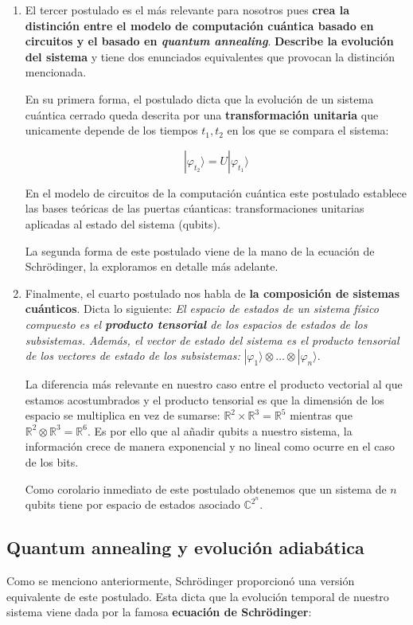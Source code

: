 \documentclass[11pt]{article}
\newcommand*{\C}{\mathds{C}}
\newcommand*{\R}{\mathbb{R}}
\newcommand*{\ra}{\rangle}
\begin{document}
\begin{enumerate}
	\item El tercer postulado es el más relevante para nosotros pues \textbf{crea la distinción entre el modelo de computación cuántica basado en circuitos y el basado en \emph{quantum annealing}}. \textbf{Describe la evolución del sistema} y tiene dos enunciados equivalentes que provocan la distinción mencionada.
	
	En su primera forma, el postulado dicta que la evolución de un sistema cuántica cerrado queda descrita por una \textbf{transformación unitaria} que unicamente depende de los tiempos $t_1,t_2$ en los que se compara el sistema:
	
	\[ |\varphi_{t_2}\ra = U|\varphi_{t_1}\ra \]
	
	En el modelo de circuitos de la computación cuántica este postulado establece las bases teóricas de las puertas cúanticas: transformaciones unitarias aplicadas al estado del sistema (qubits).
	
	La segunda forma de este postulado viene de la mano de la ecuación de Schrödinger, la exploramos en detalle más adelante.
	
	\item Finalmente, el cuarto postulado nos habla de \textbf{la composición de sistemas cuánticos}. Dicta lo siguiente: \emph{El espacio de estados de un sistema físico compuesto es el \textbf{producto tensorial} de los espacios de estados de los subsistemas. Además, el vector de estado del sistema es el producto tensorial de los vectores de estado de los subsistemas:} $|\varphi_1\ra \otimes \dotsc \otimes |\varphi_n\ra$.
	
	La diferencia más relevante en nuestro caso entre el producto vectorial al que estamos acostumbrados y el producto tensorial es que la dimensión de los espacio se multiplica en vez de sumarse: $\R^2 \times \R^3 = \R^5$ mientras que $\R^2 \otimes \R^3 = \R^6$. Es por ello que al añadir qubits a nuestro sistema, la información crece de manera exponencial y no lineal como ocurre en el caso de los bits.
	
	Como corolario inmediato de este postulado obtenemos que un sistema de $n$ qubits tiene por espacio de estados asociado $\C^{2^n}$. 
\end{enumerate}

\subsection{Quantum annealing y evolución adiabática}

Como se menciono anteriormente, Schrödinger proporcionó una versión equivalente de este postulado. Esta dicta que la evolución temporal de nuestro sistema viene dada por la famosa \textbf{ecuación de Schrödinger}:
\end{document}
